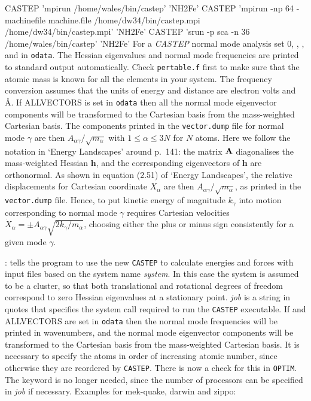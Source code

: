 {{{\obeylines
CASTEP 'mpirun /home/wales/bin/castep' 'NH2Fe'
CASTEP 'mpirun -np 64 -machinefile machine.file /home/dw34/bin/castep.mpi /home/dw34/bin/castep.mpi' 'NH2Fe'
CASTEP 'srun -p sca -n 36 /home/wales/bin/castep' 'NH2Fe'
}
For a {\it CASTEP\/} normal mode analysis set
{ 0\/}, {}, {}, and {} in {\tt odata}. 
The Hessian eigenvalues and normal mode frequencies are printed to standard output automatically.
Check {\tt pertable.f} first to make sure that the atomic mass is known for all the
elements in your system. The frequency conversion assumes that the units of energy and
distance are electron volts and \AA.
If { ALLVECTORS\/} is set in {\tt odata} then all
the normal mode eigenvector components will be transformed to the Cartesian basis from the
mass-weighted Cartesian basis.
The components printed in the {\tt vector.dump} file for normal mode $\gamma$
are then $A_{\alpha\gamma}/\sqrt{m_\alpha}$ with $1\le \alpha \le 3N$ for $N$
atoms. Here we follow the notation in `Energy Landscapes' around 
p.~141: the matrix ${\bf A}$ diagonalises the mass-weighted Hessian {\bf h},
and the corresponding eigenvectors of {\bf h} are orthonormal.
As shown in equation (2.51) of `Energy Landscapes', the relative displacements
for Cartesian coordinate $X_\alpha$ are then $A_{\alpha\gamma}/\sqrt{m_\alpha}$,
as printed in the {\tt vector.dump} file. Hence, to put kinetic energy of
magnitude $k_\gamma$ into motion corresponding to normal mode $\gamma$ requires
Cartesian velocities $\dot{X}_\alpha = \pm A_{\alpha\gamma} \sqrt{2k_\gamma/m_\alpha}$,
choosing either the plus or minus sign consistently for  a given mode $\gamma$.

: tells the program to use the new {\tt CASTEP} to calculate energies and
forces with input files based on the system name {\it system\/}.
In this case the system is assumed to be a cluster, so that both translational and rotational
degrees of freedom correspond to zero Hessian eigenvalues at a stationary point.
{\it job} is a string in quotes that specifies the system call required to run 
the {\tt CASTEP} executable. 
If {} and { ALLVECTORS\/} are set in {\tt odata} then
the normal mode frequencies will be printed in wavenumbers, and the
normal mode eigenvector components will be transformed to the Cartesian basis from the
mass-weighted Cartesian basis.
It is necessary to specify the atoms in order of increasing atomic number,
since otherwise they are reordered by {\tt CASTEP}.
There is now a check for this in {\tt OPTIM}.
The {} keyword is no longer needed, since
the number of processors can be specified in {\it job} if necessary. 
Examples for mek-quake, darwin and zippo:

}}
